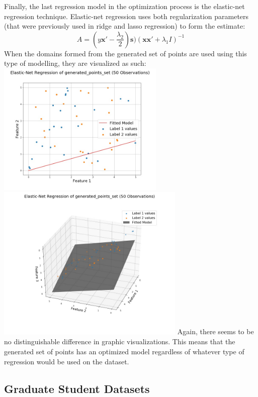 \documentclass[a4paper,12pt]{IEEEtran}
\begin{document}
Finally, the last regression model in the optimization process is the elastic-net regression technique. Elastic-net regression uses both regularization parameters (that were previously used in ridge and lasso regression) to form the estimate: $$\textit{A} = (\textit{y}\textbf{x}' - \frac{\lambda_{2}}{2})\textbf{s})(\textbf{x}\textbf{x}' +\lambda_{1} \textit{I})^{-1}$$ When the domains formed from the generated set of points are used using this type of modelling, they are visualized as such: \includegraphics[width=8cm]{en_reg_1d_generated_points_set} \includegraphics[width=9cm]{en_reg_2d_generated_points_set} Again, there seems to be no distinguishable difference in graphic visualizations. This means that the generated set of points has an optimized model regardless of whatever type of regression would be used on the dataset.

\subsection{Graduate Student Datasets}
\label{grad}
\end{document}
